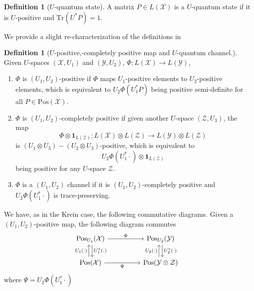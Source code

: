 \documentclass{amsart}
\numberwithin{equation}{section}
\theoremstyle{definition}
\newtheorem{definition}[theorem]{Definition}
\theoremstyle{plain}
\theoremstyle{solutionstyle}
\begin{document}
\begin{definition}[$U$-quantum state]
A matrix $P\in L(\mathcal{X})$ is a $U$-quantum state if it is $U$-positive and $\mathrm{Tr}(U^*P)=1$. \cite{bag2024quantumuchannelssspaces}
\end{definition}
We provide a slight re-characterization of the definitions in \cite{bag2024quantumuchannelssspaces}
\begin{definition}[$U$-positive,-completely positive map and $U$-quantum channel.]
Given $U$-spaces $(\mathcal{X},U_1)$ and $(\mathcal{Y},U_2)$, $\Phi:L(\mathcal{X})\to L(\mathcal{Y})$, 
    \begin{enumerate}
        \item $\Phi$ is $(U_1,U_2)$-positive if $\Phi$ maps $U_1$-positive elements to $U_2$-positive elements, which is equivalent to  $U_2\Phi(U_1^*P)$ being positive semi-definite for all $P\in \mathrm{Pos}(\mathcal{X})$.
        \item $\Phi$ is $(U_1,U_2)$-completely positive if given another $U$-space $(\mathcal{Z},U_3)$, the map \begin{equation*}\Phi\otimes \mathbf{1}_{L(\mathcal{Z})}:L(\mathcal{X})\otimes L(\mathcal{Z})\to L(\mathcal{Y})\otimes L(\mathcal{Z})\end{equation*} is $(U_1\otimes U_3)-(U_2\otimes U_3)$-positive, which is equivalent to \begin{equation*}U_2\Phi(U_1^*\cdot)\otimes \mathbf{1}_{L(\mathcal{Z})}\end{equation*} being positive for any $U$-space $\mathcal{Z}$.
        \item $\Phi$ is a $(U_1,U_2)$ channel if it is $(U_1,U_2)$-completely positive and $U_2\Phi(U_1^*\cdot)$ is trace-preserving. 
    \end{enumerate}
\end{definition}
We have, as in the Krein case, the following commutative diagrams. Given a $(U_1,U_2)$-positive map, the following diagram commutes
\begin{equation*}
\begin{tikzcd}[column sep=huge]
\mathrm{Pos}_{U_1}(\mathcal{X})
  \arrow[r, "\Phi"]
  \arrow[d, shift left=1, "U_1^*(\cdot)"]
&
\mathrm{Pos}_{U_2}(\mathcal{Y})
  \arrow[d, shift left=1, "U_2^*(\cdot)"] \\
\mathrm{Pos}(\mathcal{X})
  \arrow[r, "\Psi"']
  \arrow[u, shift left=1, "U_1(\cdot)"]
&
\mathrm{Pos}(\mathcal{Y}\otimes \mathcal{Z})
  \arrow[u, shift left=1, "U_2(\cdot)"]
\end{tikzcd}
\end{equation*}
where $\Psi=U_2\Phi(U_1^*\cdot)$
\end{document}
